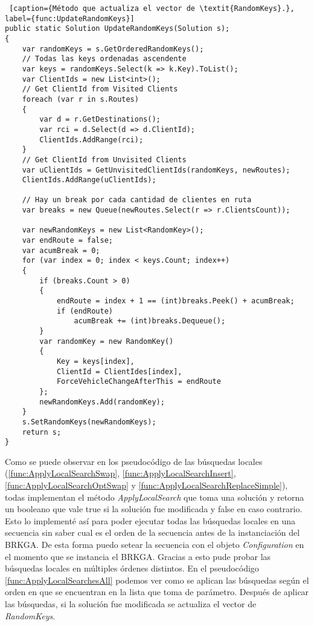 \begin{minipage}{\textwidth}
\begin{lstlisting} [caption={Método que actualiza el vector de \textit{RandomKeys}.}, label={func:UpdateRandomKeys}]
public static Solution UpdateRandomKeys(Solution s);
{
	var randomKeys = s.GetOrderedRandomKeys();
	// Todas las keys ordenadas ascendente
	var keys = randomKeys.Select(k => k.Key).ToList();
	var ClientIds = new List<int>();
	// Get ClientId from Visited Clients
	foreach (var r in s.Routes)
	{
		var d = r.GetDestinations();
		var rci = d.Select(d => d.ClientId);
		ClientIds.AddRange(rci);
	}
	// Get ClientId from Unvisited Clients
	var uClientIds = GetUnvisitedClientIds(randomKeys, newRoutes);
	ClientIds.AddRange(uClientIds);

	// Hay un break por cada cantidad de clientes en ruta 
	var breaks = new Queue(newRoutes.Select(r => r.ClientsCount));

	var newRandomKeys = new List<RandomKey>();
	var endRoute = false;
	var acumBreak = 0;
	for (var index = 0; index < keys.Count; index++)
	{
		if (breaks.Count > 0)
		{		
			endRoute = index + 1 == (int)breaks.Peek() + acumBreak;
			if (endRoute)
				acumBreak += (int)breaks.Dequeue();
		}		
		var randomKey = new RandomKey()
		{
			Key = keys[index],
			ClientId = ClientIdes[index],
			ForceVehicleChangeAfterThis = endRoute
		};
		newRandomKeys.Add(randomKey);
	}
	s.SetRandomKeys(newRandomKeys);
	return s;
}
\end{lstlisting}
\end{minipage}

Como se puede observar en los pseudocódigo de las búsquedas locales (\ref{func:ApplyLocalSearchSwap}, \ref{func:ApplyLocalSearchInsert}, \ref{func:ApplyLocalSearchOptSwap} y \ref{func:ApplyLocalSearchReplaceSimple}), todas implementan el método \textit{ApplyLocalSearch} que toma una solución y retorna un booleano que vale true si la solución fue modificada y false en caso contrario. Esto lo implementé así para poder ejecutar todas las búsquedas locales en una secuencia sin saber cual es el orden de la secuencia antes de la instanciación del BRKGA. De esta forma puedo setear la secuencia con el objeto \textit{Configuration} en el momento que se instancia el BRKGA. Gracias a esto pude probar las búsquedas locales en múltiples órdenes distintos. En el pseudocódigo \ref{func:ApplyLocalSearchesAll} podemos ver como se aplican las búsquedas según el orden en que se encuentran en la lista que toma de parámetro. Después de aplicar las búsquedas, si la solución fue modificada se actualiza el vector de \textit{RandomKeys}.

